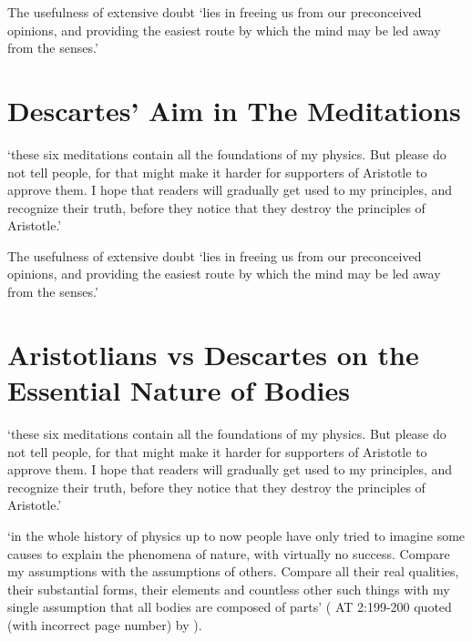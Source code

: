 \documentclass[12pt]{extarticle}
\date{}
\begin{document}
\begin{multicols*}{3}

\setlength\footnotesep{1em}









The usefulness of extensive doubt ‘lies in freeing us from our preconceived opinions,  and providing the easiest route by which the mind may be  led away from the senses.’
 
 
 
\section{Descartes’ Aim in The Meditations}
 
‘these six meditations contain all the foundations of my physics.  But please do not tell people, for that might make it harder for supporters of Aristotle to approve them.  I hope that readers will gradually get used to my principles, and recognize their truth,  before they notice that  they destroy the principles of Aristotle.’ 
 
The usefulness of extensive doubt ‘lies in freeing us from our preconceived opinions,  and providing the easiest route by which the mind may be  led away from the senses.’
 
 
 
\section{Aristotlians vs Descartes on the Essential Nature of Bodies}
 
‘these six meditations contain all the foundations of my physics.  But please do not tell people, for that might make it harder for supporters of Aristotle to approve them.  I hope that readers will gradually get used to my principles, and recognize their truth,  before they notice that  they destroy the principles of Aristotle.’ 
 
‘in the whole history of physics up to now people have
only tried to imagine some causes to explain the phenomena of nature, with
virtually no success.
Compare my assumptions with the assumptions of others.
Compare all their real qualities, their substantial forms, their elements and
countless other such things
with 
my single assumption that 
all bodies are composed of parts’
(\citealp[p.~107]{descartes:1984_vol3} AT 2:199-200 quoted (with incorrect page number) by \citealp{sorell:2018_experimental}).
 

\end{multicols*}
\end{document}
